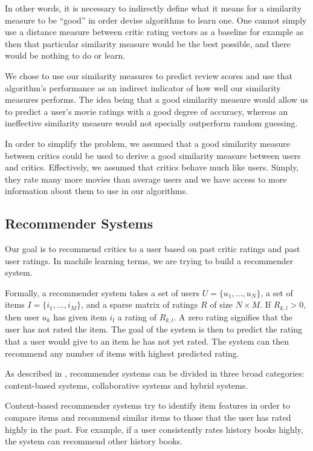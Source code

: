 \documentclass[10.5pt]{article}
\begin{document}
In other words, it is necessary to indirectly define what it means for a
similarity measure to be ``good'' in order devise algorithms to learn one. One
cannot simply use a distance measure between critic rating vectors as a
baseline for example as then that particular similarity measure would be the
best possible, and there would be nothing to do or learn.

We chose to use our similarity measures to predict review scores and use that
algorithm's performance as an indirect indicator of how well our similarity
measures performs. The idea being that a good similarity measure would allow
us to predict a user's movie ratings with a good degree of accuracy, whereas an
ineffective similarity measure would not specially outperform random guessing.

In order to simplify the problem, we assumed that a good similarity measure
between critics could be used to derive a good similarity measure
between users and critics. Effectively, we assumed that critics behave much
like users. Simply, they rate many more movies than average users and we have
access to more information about them to use in our algorithms.

\subsection{Recommender Systems}

Our goal is to recommend critics to a user
based on past critic ratings and past user ratings. In machile learning terms,
we are trying to build a recommender system.

Formally, a recommender system takes a set of users $U = \{u_1, ..., u_N\}$, a
set of items $I = \{i_1, ..., i_M\}$, and a sparse matrix of ratings
$R$ of size $N \times M$. If $R_{k,l} > 0$, then user $u_k$ has given item
$i_l$ a rating of $R_{k,l}$. A zero rating signifies that the
user has not rated the item. The goal of the system is then to predict the
rating that a user would give to an item he has not yet rated. The system can
then recommend any number of items with highest predicted rating.

As described in \cite{Survey05}, recommender systems can be divided in three
broad categories: content-based systems, collaborative systems and hybrid
systems. 

Content-based recommender systems try to identify item features in order to
compare items and recommend similar items to those that the user has rated
highly in the past.  For example, if a user consistently rates history books
highly, the system can recommend other history books.
\end{document}
